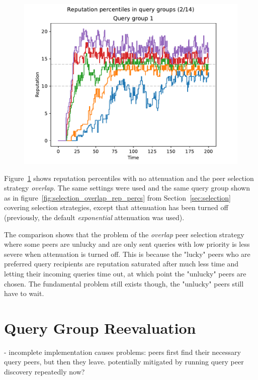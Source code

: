 \begin{figure}[t]
\centering
\includegraphics[width=1\columnwidth]{figures/attenuation_no_attenuation_selection_overlap_rep_percs_2_of_14}
\label{fig:attenuation_no_att_selection_overlap_rep_percs}
\end{figure}

Figure~\ref{fig:attenuation_no_att_selection_overlap_rep_percs} shows reputation
percentiles with no attenuation and the peer selection strategy \emph{overlap}.
The same settings were used and the same query group shown as in
figure~\ref{fig:selection_overlap_rep_percs} from Section~\ref{sec:selection}
covering selection strategies, except that attenuation has been turned off
(previously, the default \emph{exponential} attenuation was used).

The comparison shows that the problem of the \emph{overlap} peer selection
strategy where some peers are unlucky and are only sent queries with low
priority is less severe when attenuation is turned off. This is because the
"lucky" peers who are preferred query recipients are reputation saturated after
much less time and letting their incoming queries time out, at which point the
"unlucky" peers are chosen. The fundamental problem still exists though, the
"unlucky" peers still have to wait.

\section{Query Group Reevaluation}
\label{sec:rep_avail_group_reeval}
- incomplete implementation causes problems: peers first find their necessary
  query peers, but then they leave. potentially mitigated by running query peer
  discovery repeatedly now?

